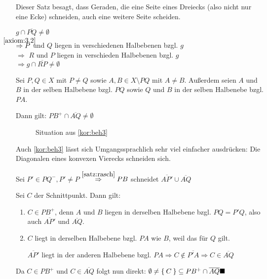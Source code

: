 Dieser Satz besagt, dass Geraden, die eine Seite eines Dreiecks 
(also nicht nur eine Ecke) schneiden, auch eine weitere Seite 
scheiden.

\begin{beweis}
    $g \cap \overline{PQ} \neq \emptyset$\\
    $\overset{\mathclap{\ref{axiom:3.2}}}{\Rightarrow} P$ und $Q$ liegen in verschiedenen Halbebenen bzgl. $g$\\
    $\Rightarrow$ \obda $R$ und $P$ liegen in verschieden
    Halbebenen bzgl. $g$\\
    $\Rightarrow g \cap \overline{RP} \neq \emptyset$
\end{beweis}

\begin{korollar}\label{kor:beh3}
    Sei $P, Q \in X$ mit $P \neq Q$ sowie $A, B \in X \setminus PQ$ 
    mit $A \neq B$.
    Außerdem seien $A$ und $B$ in der selben Halbebene bzgl. $PQ$ sowie
    $Q$ und $B$ in der selben Halbenebe bzgl. $PA$.

    Dann gilt: $PB^+ \cap \overline{AQ} \neq \emptyset$
\end{korollar}

\begin{figure}[htp]
    \centering
    
    \caption{Situation aus \cref{kor:beh3}}
    \label{fig:bild-5}
\end{figure}

Auch \cref{kor:beh3} lässt sich Umgangssprachlich sehr viel 
einfacher ausdrücken: Die Diagonalen eines konvexen Vierecks 
schneiden sich.

\begin{beweis}%
    Sei $P' \in PQ^-, P' \neq P$
    $\overset{\cref{satz:rasch}}{\Rightarrow} PB$ schneidet
    $\overline{AP'} \cup \overline{AQ}$

    Sei $C$ der Schnittpunkt. Dann gilt:
    \begin{enumerate}[label=(\roman*)]
        \item $C \in PB^+$, denn $A$ und $B$ liegen in derselben
              Halbebene bzgl. $PQ = P'Q$, also auch
              $\overline{AP'}$ und $\overline{AQ}$.
        \item $C$ liegt in derselben Halbebene bzgl. $PA$ wie
              $B$, weil das für $Q$ gilt.

              $\overline{AP'}$ liegt in der anderen Halbebene
              bzgl. $PA \Rightarrow C \notin \overline{P'A} \Rightarrow C \in \overline{AQ}$
    \end{enumerate}
    Da $C \in PB^+$ und $C \in \overline{AQ}$ folgt nun direkt: 
    $\emptyset \neq \Set{C} \subseteq PB^+ \cap \overline{AQ} \qed$
\end{beweis}

